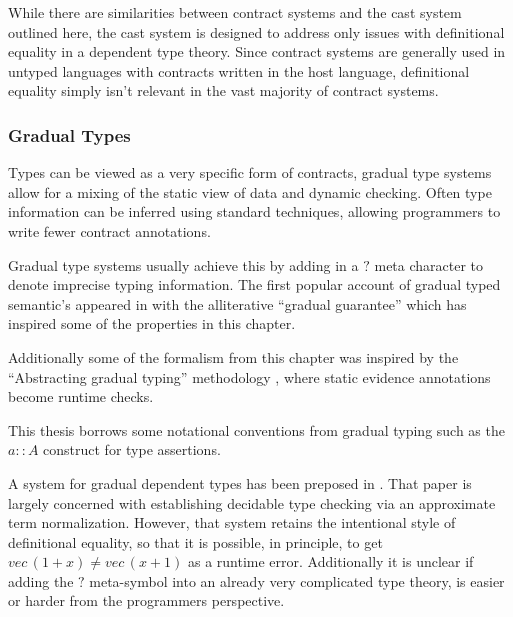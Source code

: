 While there are similarities between contract systems and the cast system outlined here, the cast system is designed to address only issues with definitional equality in a dependent type theory.
Since contract systems are generally used in untyped languages with contracts written in the host language, definitional equality simply isn't relevant in the vast majority of contract systems.

\subsubsection{Gradual Types}

Types can be viewed as a very specific form of contracts, gradual type systems allow for a mixing of the static view of data and dynamic checking.
Often type information can be inferred using standard techniques, allowing programmers to write fewer contract annotations.

Gradual type systems usually achieve this by adding in a $?$ meta character to denote imprecise typing information.
The first popular account of gradual typed semantic's appeared in \cite{siek_et_al:LIPIcs:2015:5031} with the alliterative ``gradual guarantee'' which has inspired some of the properties in this chapter.



Additionally some of the formalism from this chapter was inspired by the ``Abstracting gradual typing'' methodology \cite{10.1145/2837614.2837670}, where static evidence annotations become runtime checks. 

This thesis borrows some notational conventions from gradual typing such as the $a::A$ construct for type assertions.

A system for gradual dependent types has been preposed in \cite{10.1145/3341692}.
That paper is largely concerned with establishing decidable type checking via an approximate term normalization. However, that system retains the intentional style of definitional equality, so that it is possible, in principle, to get $vec\,(1+x)\neq vec\,(x+1)$ as a runtime error.
Additionally it is unclear if adding the $?$ meta-symbol into an already very complicated type theory, is easier or harder from the programmers perspective.

